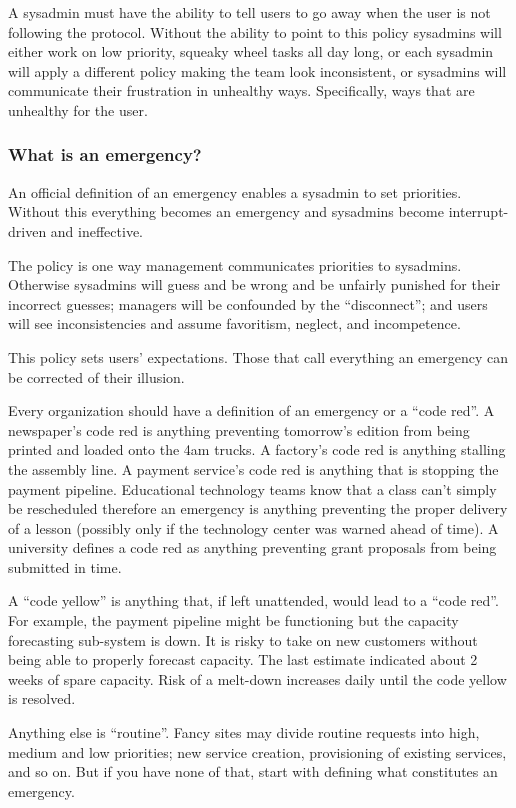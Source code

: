 \documentclass{article}
\begin{document}
A sysadmin must have the ability to tell users to go away when the user is not following the protocol. Without the ability to point to this policy sysadmins will either work on low priority, squeaky wheel tasks all day long, or each sysadmin will apply a different policy making the team look inconsistent, or sysadmins will communicate their frustration in unhealthy ways. Specifically, ways that are unhealthy for the user.

\subsubsection*{What is an emergency?}
An official definition of an emergency enables a sysadmin to set priorities. Without this everything becomes an emergency and sysadmins become interrupt-driven and ineffective.

The policy is one way management communicates priorities to sysadmins. Otherwise sysadmins will guess and be wrong and be unfairly punished for their incorrect guesses; managers will be confounded by the ``disconnect''; and users will see inconsistencies and assume favoritism, neglect, and incompetence.

This policy sets users' expectations. Those that call everything an emergency can be corrected of their illusion.

Every organization should have a definition of an emergency or a ``code red''. A newspaper's code red is anything preventing tomorrow's edition from being printed and loaded onto the 4am trucks. A factory's code red is anything stalling the assembly line. A payment service's code red is anything that is stopping the payment pipeline. Educational technology teams know that a class can't simply be rescheduled therefore an emergency is anything preventing the proper delivery of a lesson (possibly only if the technology center was warned ahead of time). A university defines a code red as anything preventing grant proposals from being submitted in time.

A ``code yellow'' is anything that, if left unattended, would lead to a ``code red''. For example, the payment pipeline might be functioning but the capacity forecasting sub-system is down. It is risky to take on new customers without being able to properly forecast capacity. The last estimate indicated about 2 weeks of spare capacity. Risk of a melt-down increases daily until the code yellow is resolved.

Anything else is ``routine''. Fancy sites may divide routine requests into high, medium and low priorities; new service creation, provisioning of existing services, and so on. But if you have none of that, start with defining what constitutes an emergency.
\end{document}
